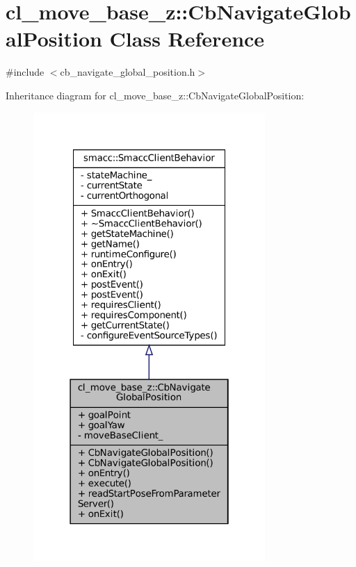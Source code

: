 \hypertarget{classcl__move__base__z_1_1CbNavigateGlobalPosition}{}\section{cl\+\_\+move\+\_\+base\+\_\+z\+:\+:Cb\+Navigate\+Global\+Position Class Reference}
\label{classcl__move__base__z_1_1CbNavigateGlobalPosition}


{\ttfamily \#include $<$cb\+\_\+navigate\+\_\+global\+\_\+position.\+h$>$}



Inheritance diagram for cl\+\_\+move\+\_\+base\+\_\+z\+:\+:Cb\+Navigate\+Global\+Position\+:
\nopagebreak
\begin{figure}[H]
\begin{center}
\leavevmode
\includegraphics[width=250pt]{classcl__move__base__z_1_1CbNavigateGlobalPosition__inherit__graph}
\end{center}
\end{figure}


